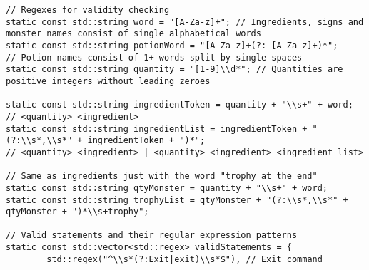 \documentclass[a4paper,12pt]{article}
\begin{document}
\begin{lstlisting}[style=CStyle]
// Regexes for validity checking
static const std::string word = "[A-Za-z]+"; // Ingredients, signs and monster names consist of single alphabetical words
static const std::string potionWord = "[A-Za-z]+(?: [A-Za-z]+)*";
// Potion names consist of 1+ words split by single spaces
static const std::string quantity = "[1-9]\\d*"; // Quantities are positive integers without leading zeroes

static const std::string ingredientToken = quantity + "\\s+" + word; // <quantity> <ingredient>
static const std::string ingredientList = ingredientToken + "(?:\\s*,\\s*" + ingredientToken + ")*";
// <quantity> <ingredient> | <quantity> <ingredient> <ingredient_list>

// Same as ingredients just with the word "trophy at the end"
static const std::string qtyMonster = quantity + "\\s+" + word;
static const std::string trophyList = qtyMonster + "(?:\\s*,\\s*" + qtyMonster + ")*\\s+trophy";

// Valid statements and their regular expression patterns
static const std::vector<std::regex> validStatements = {
        std::regex("^\\s*(?:Exit|exit)\\s*$"), // Exit command


\end{lstlisting}
\end{document}

